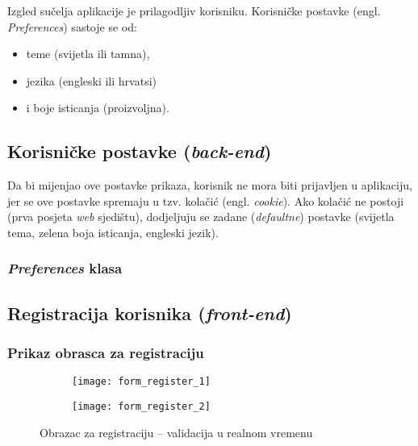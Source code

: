       Izgled sučelja aplikacije je prilagodljiv korisniku.
      Korisničke postavke (engl. \textit{Preferences}) sastoje se od:

      \begin{itemize}
        \item teme (svijetla ili tamna),
        \item jezika (engleski ili hrvatsi)
        \item i boje isticanja (proizvoljna).
      \end{itemize}


    \subsection{Korisničke postavke (\textit{back-end})}

      Da bi mijenjao ove postavke prikaza, korisnik ne mora biti
      prijavljen u aplikaciju, jer se ove postavke spremaju u tzv. kolačić
      (engl. \textit{cookie}). Ako kolačić ne postoji (prva posjeta \textit{web}
      sjedištu), dodjeljuju se zadane (\textit{defaultne}) postavke (svijetla
      tema, zelena boja isticanja, engleski jezik).

      \subsubsection{\textit{Preferences} klasa}

        

  \subsection{Registracija korisnika (\textit{front-end})}

    \subsubsection{Prikaz obrasca za registraciju}

      \begin{figure}[h]
          \begin{subfigure}{0.5\textwidth}
            \texttt{[image: form\_register\_1]}
          \end{subfigure}
          \begin{subfigure}{0.5\textwidth}
            \texttt{[image: form\_register\_2]}
          \end{subfigure}

          \caption{Obrazac za registraciju -- validacija u realnom vremenu}
      \end{figure}

